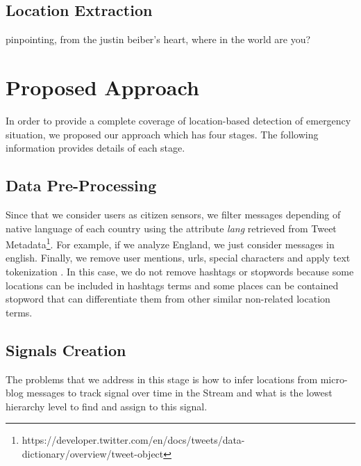 \documentclass[sigconf]{acmart}
\begin{document}
\subsection{Location Extraction}
pinpointing, from the justin beiber’s heart, where in the world are you?

\section{Proposed Approach}

In order to provide a complete coverage of location-based detection of emergency situation, we proposed our approach which has four stages. The following information provides details of each stage.

\subsection{Data Pre-Processing}

Since that we consider users as citizen sensors, we filter messages depending of native language of each country using the attribute \textit{lang} retrieved from Tweet Metadata\footnote{https://developer.twitter.com/en/docs/tweets/data-dictionary/overview/tweet-object}. For example, if we analyze England, we just consider messages in english. Finally, we remove user mentions, urls,  special characters and apply text tokenization . In this case, we do not remove hashtags or stopwords because some locations can be included in hashtags terms and some places can be contained stopword that can differentiate them from other similar non-related location terms.


\subsection{Signals Creation}
The problems that we address in this stage is how to infer locations from micro-blog messages to track signal over time in the Stream and what is the lowest hierarchy level to find and assign to this signal.
\end{document}
